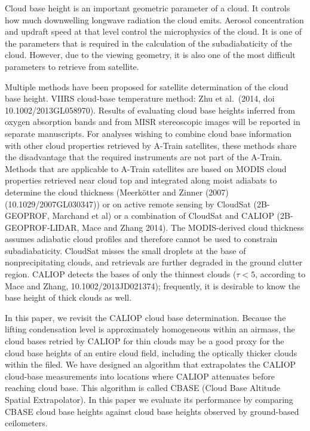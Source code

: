 \documentclass[amt,manuscript]{copernicus}\usepackage[]{graphicx}\usepackage[]{color}
\begin{document}
\introduction  %
\label{sec:intro}
Cloud base height is an important geometric parameter of a cloud.  It controls
how much downwelling longwave radiation the cloud emits.  Aerosol concentration
and updraft speed at that level control the microphysics of the cloud.  It is
one of the parameters that is required in the calculation of the subadiabaticity
of the cloud.  However, due to the viewing geometry, it is also one of the most
difficult parameters to retrieve from satellite.  

Multiple methods have been proposed for satellite determination of the cloud
base height.  VIIRS cloud-base temperature method: Zhu et al.~(2014, doi
10.1002/2013GL058970).  Results of evaluating cloud base heights inferred from
oxygen absorption bands and from MISR stereoscopic images will be reported in
separate manuscripts.  For analyses wishing to combine cloud base information
with other cloud properties retrieved by A-Train satellites, these methods share
the disadvantage that the required instruments are not part of the A-Train.
Methods that are applicable to A-Train satellites are based on MODIS cloud
properties retrieved near cloud top and integrated along moist adiabats to
determine the cloud thickness (Meerk\"otter and Zinner (2007)
(10.1029/2007GL030347)) or on active remote sensing by CloudSat (2B-GEOPROF,
Marchand et al) or a combination of CloudSat and CALIOP (2B-GEOPROF-LIDAR, Mace
and Zhang 2014).  The MODIS-derived cloud thickness assumes adiabatic cloud
profiles and therefore cannot be used to constrain subadiabaticity.  CloudSat
misses the small droplets at the base of nonprecipitating clouds, and retrievals
are further degraded in the ground clutter region.  CALIOP detects the bases of
only the thinnest clouds ($\tau < 5$, according to Mace and Zhang,
10.1002/2013JD021374); frequently, it is desirable to know the base height of
thick clouds as well.

In this paper, we revisit the CALIOP cloud base determination.  Because the
lifting condensation level is approximately homogeneous within an airmass, the
cloud bases retried by CALIOP for thin clouds may be a good proxy for the cloud
base heights of an entire cloud field, including the optically thicker clouds
within the filed.  We have designed an algorithm that extrapolates the CALIOP
cloud-base measurements into locations where CALIOP attenuates before reaching
cloud base.  This algorithm is called CBASE (Cloud Base Altitude Spatial
Extrapolator).  In this paper we evaluate its performance by comparing CBASE
cloud base heights against cloud base heights observed by ground-based
ceilometers.
\end{document}
